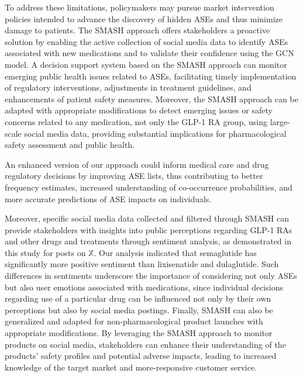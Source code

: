 \documentclass[referee,bst/sn-basic]{sn-jnl}%
\begin{document}
To address these limitations, policymakers may pursue market intervention policies intended to advance the discovery of hidden ASEs and thus minimize damage to patients.
The SMASH approach offers stakeholders a proactive solution by enabling the active collection of social media data to identify ASEs associated with new medications and to validate their confidence using the GCN model. A decision support system based on the SMASH approach can monitor emerging public health issues related to ASEs, facilitating timely implementation of regulatory interventions, adjustments in treatment guidelines, and enhancements of patient safety measures. Moreover, the SMASH approach can be adapted with appropriate modifications to detect emerging issues or safety concerns related to any medication, not only the GLP-1 RA group, using large-scale social media data, providing substantial implications for pharmacological safety assessment and public health.

An enhanced version of our approach could inform medical care and drug regulatory decisions by improving ASE lists, thus contributing to better frequency estimates, increased understanding of co-occurrence probabilities, and more accurate predictions of ASE impacts on individuals.

Moreover, specific social media data collected and filtered through SMASH can provide stakeholders with insights into public perceptions regarding GLP-1 RAs and other drugs and treatments through sentiment analysis, as demonstrated in this study for posts on $\mathbb{X}$. 
Our analysis indicated that semaglutide has significantly more positive sentiment than lixisenatide and dulaglutide.
Such differences in sentiments underscore the importance of considering not only ASEs but also user emotions associated with medications, since individual decisions regarding use of a particular drug  can be influenced not only by their own perceptions but also by social media postings.
Finally, SMASH can also be generalized and adapted for non-pharmacological product launches with appropriate modifications. 
By leveraging the SMASH approach to monitor products on social media, stakeholders can enhance their understanding of the products' safety profiles and potential adverse impacts, leading to increased knowledge of the target market and more-responsive customer service.


\end{document}
